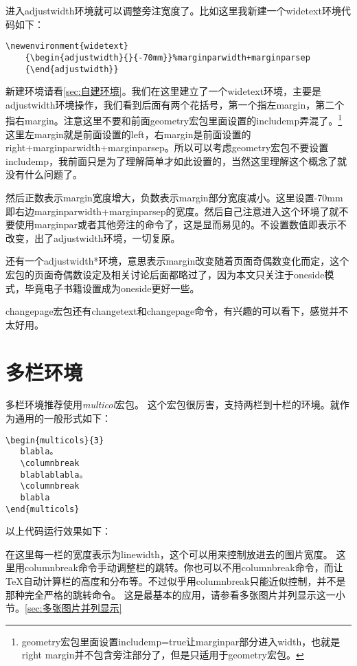 进入adjustwidth环境就可以调整旁注宽度了。比如这里我新建一个widetext环境代码如下：

\begin{verbatim}   
\newenvironment{widetext}  
	{\begin{adjustwidth}{}{-70mm}}%marginparwidth+marginparsep
	{\end{adjustwidth}}
\end{verbatim}

新建环境请看\ref{sec:自建环境}。我们在这里建立了一个widetext环境，主要是adjustwidth环境操作，我们看到后面有两个花括号，第一个指左margin，第二个指右margin。注意这里不要和前面geometry宏包里面设置的includemp弄混了。\footnote{geometry宏包里面设置includemp=true让marginpar部分进入width，也就是right margin并不包含旁注部分了，但是只适用于geometry宏包。}这里左margin就是前面设置的left，右margin是前面设置的right+marginparwidth+marginparsep。所以可以考虑geometry宏包不要设置includemp，我前面只是为了理解简单才如此设置的，当然这里理解这个概念了就没有什么问题了。

然后正数表示margin宽度增大，负数表示margin部分宽度减小。这里设置-70mm即右边marginparwidth+marginparsep的宽度。然后自己注意进入这个环境了就不要使用marginpar或者其他旁注的命令了，这是显而易见的。不设置数值即表示不改变，出了adjustwidth环境，一切复原。

还有一个adjustwidth*环境，意思表示margin改变随着页面奇偶数变化而定，这个宏包的页面奇偶数设定及相关讨论后面都略过了，因为本文只关注于oneside模式，毕竟电子书籍设置成为oneside更好一些。

changepage宏包还有changetext和changepage命令，有兴趣的可以看下，感觉并不太好用。


\section{多栏环境}
多栏环境推荐使用\emph{multicol}宏包。
这个宏包很厉害，支持两栏到十栏的环境。就作为通用的一般形式如下：
\begin{verbatim}
\begin{multicols}{3}
   blabla。
   \columnbreak
   blablablabla。
   \columnbreak
   blabla
\end{multicols}
\end{verbatim}
以上代码运行效果如下：
\begin{multicols}{3}
   在这里每一栏的宽度表示为linewidth，这个可以用来控制放进去的图片宽度。
   \columnbreak
   这里用columnbreak命令手动调整栏的跳转。你也可以不用columnbreak命令，而让\TeX 自动计算栏的高度和分布等。不过似乎用columnbreak只能近似控制，并不是那种完全严格的跳转命令。
   \columnbreak
   这是最基本的应用，请参看多张图片并列显示这一小节。\ref{sec:多张图片并列显示}
\end{multicols}


